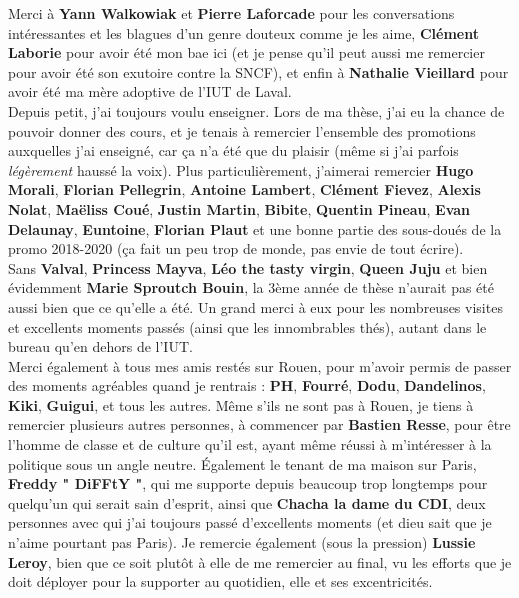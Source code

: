Merci à \textbf{Yann Walkowiak} et \textbf{Pierre Laforcade} pour les conversations intéressantes et les blagues d'un genre douteux comme je les aime, \textbf{Clément Laborie} pour avoir été mon bae ici (et je pense qu'il peut aussi me remercier pour avoir été son exutoire contre la SNCF), et enfin à \textbf{Nathalie Vieillard} pour avoir été ma mère adoptive de l'IUT de Laval.\\

Depuis petit, j'ai toujours voulu enseigner. Lors de ma thèse, j'ai eu la chance de pouvoir donner des cours, et je tenais à remercier l'ensemble des promotions auxquelles j'ai enseigné, car ça n'a été que du plaisir (même si j'ai parfois \textit{légèrement} haussé la voix). Plus particulièrement, j'aimerai remercier \textbf{Hugo Morali}, \textbf{Florian Pellegrin}, \textbf{Antoine Lambert}, \textbf{Clément Fievez}, \textbf{Alexis Nolat}, \textbf{Maëliss Coué}, \textbf{Justin Martin}, \textbf{Bibite}, \textbf{Quentin Pineau}, \textbf{Evan Delaunay}, \textbf{Euntoine}, \textbf{Florian Plaut} et une bonne partie des sous-doués de la promo 2018-2020 (ça fait un peu trop de monde, pas envie de tout écrire).\\

Sans \textbf{Valval}, \textbf{Princess Mayva}, \textbf{Léo the tasty virgin}, \textbf{Queen Juju} et bien évidemment \textbf{Marie Sproutch Bouin}, la 3ème année de thèse n'aurait pas été aussi bien que ce qu'elle a été. Un grand merci à eux pour les nombreuses visites et excellents moments passés (ainsi que les innombrables thés), autant dans le bureau qu'en dehors de l'IUT.\\

Merci également à tous mes amis restés sur Rouen, pour m'avoir permis de passer des moments agréables quand je rentrais : \textbf{PH}, \textbf{Fourré}, \textbf{Dodu}, \textbf{Dandelinos}, \textbf{Kiki}, \textbf{Guigui}, et tous les autres. Même s'ils ne sont pas à Rouen, je tiens à remercier plusieurs autres personnes, à commencer par \textbf{Bastien Resse}, pour être l'homme de classe et de culture qu'il est, ayant même réussi à m'intéresser à la politique sous un angle neutre. Également le tenant de ma maison sur Paris, \textbf{Freddy " DiFFtY "}, qui me supporte depuis beaucoup trop longtemps pour quelqu'un qui serait sain d'esprit, ainsi que \textbf{Chacha la dame du CDI}, deux personnes avec qui j'ai toujours passé d'excellents moments (et dieu sait que je n'aime pourtant pas Paris). Je remercie également (sous la pression) \textbf{Lussie Leroy}, bien que ce soit plutôt à elle de me remercier au final, vu les efforts que je doit déployer pour la supporter au quotidien, elle et ses excentricités.\\

